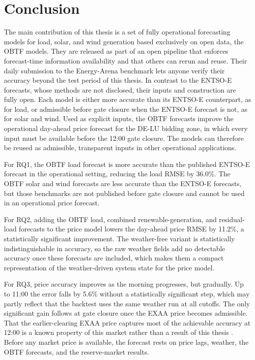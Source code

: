 \section{Conclusion}
\label{sec:conclusion}

The main contribution of this thesis is a set of fully operational forecasting
models for load, solar, and wind generation based exclusively on open data, the
OBTF models. They are released as part of an open pipeline that enforces
forecast-time information availability and that others can rerun and reuse.
Their daily submission to the Energy-Arena benchmark
\cite{kleinebrahm2026energyarena} lets anyone verify their accuracy beyond
the test period of this thesis. In
contrast to the \mbox{ENTSO-E} forecasts, whose methods are not disclosed, their
inputs and construction are fully open. Each model is either more accurate than its
\mbox{ENTSO-E} counterpart, as for load, or admissible before gate closure when
the \mbox{ENTSO-E} forecast is not, as for solar and wind. Used as explicit
inputs, the OBTF forecasts improve the operational day-ahead price forecast for
the \mbox{DE-LU} bidding zone, in which every input must be available before the
12:00 gate closure. The models can therefore be reused as admissible,
transparent inputs in other operational applications.

For RQ1, the OBTF load forecast is more accurate than the published
\mbox{ENTSO-E} forecast in the operational setting, reducing the load RMSE by
36.0\%. The OBTF solar and wind forecasts are less accurate than the
\mbox{ENTSO-E} forecasts, but those benchmarks are not published before gate
closure and cannot be used in an operational price forecast.

For RQ2, adding the OBTF load, combined renewable-generation, and
residual-load forecasts to the price model lowers the day-ahead price RMSE by
11.2\%, a statistically significant improvement. The weather-free variant is
statistically indistinguishable in accuracy, so the raw weather fields add no detectable accuracy once these
forecasts are included, which makes them a compact representation of the
weather-driven system state for the price model.

For RQ3, price accuracy improves as the morning progresses, but gradually. Up to 11:00 the error falls by 5.6\% without a statistically significant step,
which may partly reflect that the backtest uses the same weather run at all
cutoffs. The only significant gain follows at gate closure once the EXAA price
becomes admissible. That
the earlier-clearing EXAA price captures most of the achievable accuracy at 12:00
is a known property of this market rather than a result of this thesis
\cite{eiser2026operational}. Before any market price is available, the forecast
rests on price lags, weather, the OBTF forecasts, and the
reserve-market results.

